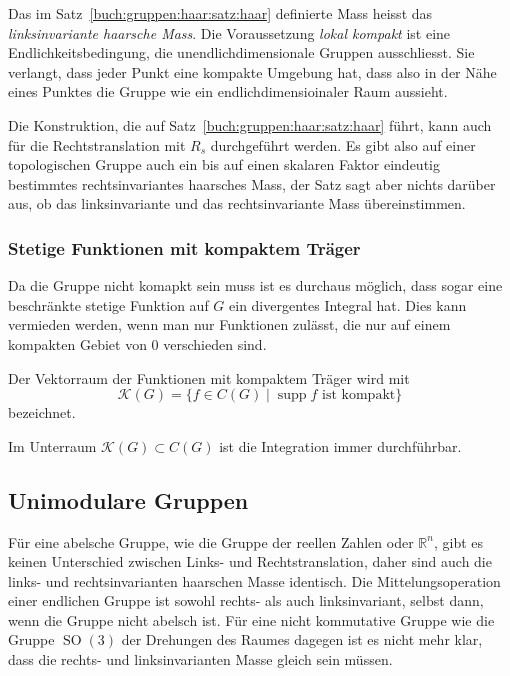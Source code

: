 Das im Satz~\ref{buch:gruppen:haar:satz:haar} definierte Mass
heisst das {\em linksinvariante haarsche Mass}.
%
Die Voraussetzung {\em lokal kompakt} ist eine Endlichkeitsbedingung,
%
die unendlichdimensionale Gruppen ausschliesst.
Sie verlangt, dass jeder Punkt eine kompakte Umgebung hat, dass also
in der Nähe eines Punktes die Gruppe wie ein endlichdimensioinaler 
Raum aussieht.

Die Konstruktion, die auf Satz~\ref{buch:gruppen:haar:satz:haar}
führt, kann auch für die Rechtstranslation mit $R_s$ durchgeführt
werden.
Es gibt also auf einer topologischen Gruppe auch ein bis auf einen
skalaren Faktor eindeutig bestimmtes rechtsinvariantes haarsches Mass,
der Satz sagt aber nichts darüber aus, ob das linksinvariante und das
rechtsinvariante Mass übereinstimmen.

%
%
\subsubsection{Stetige Funktionen mit kompaktem Träger}
Da die Gruppe nicht komapkt sein muss ist es durchaus möglich,
dass sogar eine beschränkte stetige Funktion auf $G$ ein divergentes
Integral hat.
Dies kann vermieden werden, wenn man nur Funktionen zulässt, die
nur auf einem kompakten Gebiet von $0$ verschieden sind.

\begin{definition}
Der Vektorraum der Funktionen mit kompaktem Träger wird mit
\[
\mathscr{K}(G)
=
\{ f\in C(G)\mid \text{$\operatorname{supp}f $ ist kompakt}\}
\]
bezeichnet.
\end{definition}

Im Unterraum $\mathscr{K}(G)\subset C(G)$ ist die Integration
immer durchführbar.

%
%
\subsection{Unimodulare Gruppen
\label{buch:haar:subsection:unimodular}}
Für eine abelsche Gruppe, wie die Gruppe der reellen Zahlen
oder $\mathbb{R}^n$, gibt es keinen Unterschied zwischen Links- und
Rechtstranslation, daher sind auch die links- und rechtsinvarianten
haarschen Masse identisch.
Die Mittelungsoperation einer endlichen Gruppe ist sowohl rechts-
als auch linksinvariant, selbst dann, wenn die Gruppe nicht abelsch
ist.
Für eine nicht kommutative Gruppe wie die Gruppe $\operatorname{SO}(3)$
der Drehungen des Raumes dagegen ist es nicht mehr klar, dass 
die rechts- und linksinvarianten Masse gleich sein müssen.

